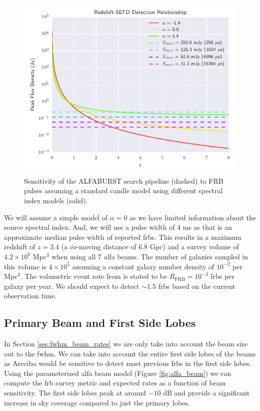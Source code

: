 \documentclass[a4paper,fleqn,usenatbib]{mnras}
\begin{document}
\begin{figure}
    \includegraphics[width=1.0\linewidth]{figures/fwhm_sefd_z_relation.pdf}
    \caption{Sensitivity of the ALFABURST search pipeline (dashed) to FRB pulses
    assuming a standard candle model using different spectral index models
    (solid).
    }
    \label{fig:fwhm_sefd_z}
\end{figure}

We will assume a simple model of $\alpha=0$ as we have limited information about
the source spectral index. And, we will use a pulse width of 4 ms as that is an
approximate median pulse width of reported \glspl{frb}. This results in a
maximum redshift of $z=3.4$ (a co-moving distance of 6.8 Gpc) and a survey volume
of $4.2 \times 10^6$ Mpc$^3$ when using all 7 \gls{alfa} beams. The number of
galaxies sampled in this volume is $4 \times 10^5$ assuming a constant galaxy
number density of $10^{-2}$ per Mpc$^3$.  The volumetric event rate from
\cite{2013Sci...341...53T} is stated to be $R_{\textrm{FRB}} = 10^{-3}$
\glspl{frb} per galaxy per year. We should expect to detect $\sim 1.5$
\glspl{frb} based on the current observation time.

\subsection{Primary Beam and First Side Lobes}
\label{sec:full_beam_rates}

In Section \ref{sec:fwhm_beam_rates} we are only take into account the beam
size out to the \gls{fwhm}. We can take into account the entire first side lobes
of the beams as Arecibo would be sensitive to detect most previous
\glspl{frb} in the first side lobes. Using the parameterized \gls{alfa} beam
model (Figure \ref{fig:alfa_beam}) \citep{GALFAbeam} we can compute the
\gls{frb} survey metric and expected rates as a function of beam sensitivity.
The first side lobes peak at around $-10$ dB and provide a significant increase
in sky coverage compared to just the primary lobes.
\end{document}
